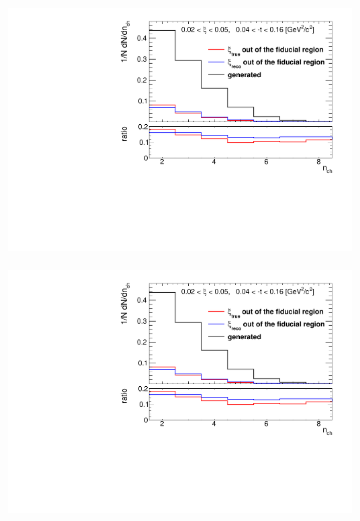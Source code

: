 \begin{figure}[h!]
	\centering
	\begin{subfigure}{.49\textwidth}
		\includegraphics[width=\textwidth,page=4]{chapters/chrgSTAR/img/xiMigration/xi.pdf}
	\end{subfigure}
	\begin{subfigure}{.49\textwidth}
		\includegraphics[width=\textwidth,page=5]{chapters/chrgSTAR/img/xiMigration/xi.pdf}
	\end{subfigure}
	\begin{subfigure}{.49\textwidth}

\end{subfigure}
\end{figure}
